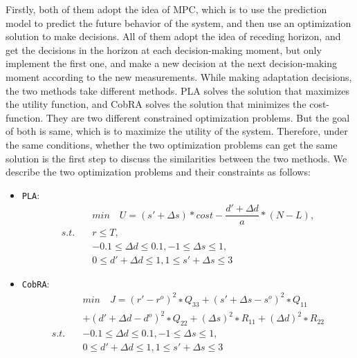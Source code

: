 \documentclass[sigconf]{acmart}
\begin{document}
Firstly, both of them adopt the idea of MPC, which is to use the prediction model to predict the future behavior of the system, and then use an optimization solution to make decisions. All of them adopt the idea of receding horizon, and get the decisions in the horizon at each decision-making moment, but only implement the first one, and make a new decision at the next decision-making moment according to the new measurements. While making adaptation decisions, the two methods take different methods. PLA solves the solution that maximizes the utility function, and CobRA solves the solution that minimizes the cost-function. They are two different constrained optimization problems. But the goal of both is same, which is to maximize the utility of the system. Therefore, under the same conditions, whether the two optimization problems can get the same solution is the first step to discuss the similarities between the two methods. We describe the two optimization problems and their constraints as follows:
\begin{itemize}
	\item {\verb|PLA|}:
	\begin{equation}
	\begin{aligned}
	&min\quad U=(s'+\Delta s)*cost-\dfrac{d'+\Delta d}{a}*(N-L), \\
	s.t.\quad &r\leq T,\\
	&-0.1\leq \Delta d\leq 0.1, -1\leq \Delta s\leq 1,\\
	&0\leq d'+\Delta d\leq 1,1\leq s'+\Delta s\leq 3
	\end{aligned}
	\end{equation}
	\item {\verb|CobRA|}:
	\begin{equation}
	\begin{aligned}
	&min\quad J=(r'-r^o)^2∗Q_{33}+(s'+\Delta s-s^o )^2∗Q_{11}\\
	&+(d'+\Delta d-d^o)^2∗Q_{22}+(\Delta s)^{2}∗R_{11}+(\Delta d)^2∗R_{22}\\
	s.t.\quad &-0.1\leq \Delta d\leq 0.1, -1\leq \Delta s\leq 1,\\
	&0\leq d'+\Delta d\leq 1,1\leq s'+\Delta s\leq 3
	\end{aligned}
	\end{equation}
\end{itemize}
\end{document}
